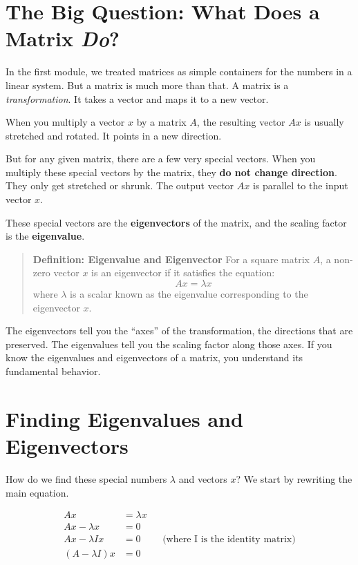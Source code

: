 \documentclass[
  letterpaper,
  DIV=11,
  numbers=noendperiod]{scrreprt}
\begin{document}
\section{\texorpdfstring{The Big Question: What Does a Matrix
\emph{Do}?}{The Big Question: What Does a Matrix Do?}}\label{the-big-question-what-does-a-matrix-do}

In the first module, we treated matrices as simple containers for the
numbers in a linear system. But a matrix is much more than that. A
matrix is a \emph{transformation}. It takes a vector and maps it to a
new vector.

When you multiply a vector \(x\) by a matrix \(A\), the resulting vector
\(Ax\) is usually stretched and rotated. It points in a new direction.

But for any given matrix, there are a few very special vectors. When you
multiply these special vectors by the matrix, they \textbf{do not change
direction}. They only get stretched or shrunk. The output vector \(Ax\)
is parallel to the input vector \(x\).

These special vectors are the \textbf{eigenvectors} of the matrix, and
the scaling factor is the \textbf{eigenvalue}.

\begin{quote}
\textbf{Definition: Eigenvalue and Eigenvector} For a square matrix
\(A\), a non-zero vector \(x\) is an eigenvector if it satisfies the
equation: \[ Ax = \lambda x \] where \(\lambda\) is a scalar known as
the eigenvalue corresponding to the eigenvector \(x\).
\end{quote}

The eigenvectors tell you the ``axes'' of the transformation, the
directions that are preserved. The eigenvalues tell you the scaling
factor along those axes. If you know the eigenvalues and eigenvectors of
a matrix, you understand its fundamental behavior.

\section{Finding Eigenvalues and
Eigenvectors}\label{finding-eigenvalues-and-eigenvectors}

How do we find these special numbers \(\lambda\) and vectors \(x\)? We
start by rewriting the main equation.

\[
\begin{align*}
Ax &= \lambda x \\
Ax - \lambda x &= 0 \\
Ax - \lambda I x &= 0 && \text{(where I is the identity matrix)} \\
(A - \lambda I)x &= 0
\end{align*}
\]
\end{document}
